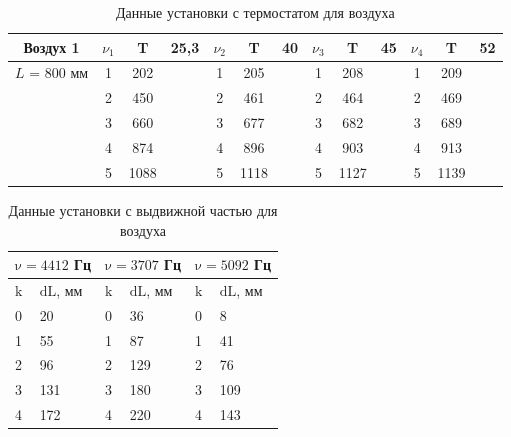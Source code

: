 \documentclass[a4paper, 12pt]{article}
\begin{document}
\begin{table}[!h]
\begin{center}
\caption{Данные установки с термостатом для воздуха}
\begin{tabular}{|c|c|c|c|c|c|c|c|c|c|c|c|c|}
\hline
Воздух 1     & $\nu_1$ & T    & 25,3 & $\nu_2$ & T    & 40 & $\nu_3$ & T    & 45 & $\nu_4$ & T    & 52 \\ \hline
$L$ = 800 мм & 1       & 202  &      & 1      & 205  &    & 1      & 208  &    & 1      & 209  &    \\ \hline
             & 2       & 450  &      & 2      & 461  &    & 2      & 464  &    & 2      & 469  &    \\ \hline
             & 3       & 660  &      & 3      & 677  &    & 3      & 682  &    & 3      & 689  &    \\ \hline
             & 4       & 874  &      & 4      & 896  &    & 4      & 903  &    & 4      & 913  &    \\ \hline
             & 5       & 1088 &      & 5      & 1118 &    & 5      & 1127 &    & 5      & 1139 &    \\ \hline
\end{tabular}
\end{center}
\end{table}

\begin{table}[!h]
\begin{center}
\begin{tabular}{|l|l|l|l|l|l|}
\hline \multicolumn{2}{|l|}{$\mathrm{\nu}=4412$ Гц} & \multicolumn{2}{|l|}{$\mathrm{\nu}=3707$ Гц} & \multicolumn{2}{|l|}{$\mathrm{\nu}=5092$ Гц}\\ \hline 
$\mathrm{k}$ & $\mathrm{dL}$, мм & $\mathrm{k}$ & $\mathrm{dL}$, мм & $\mathrm{k}$ & $\mathrm{dL}$, мм  \\ \hline 
0 & 20 & 0 & 36 & 0 & 8 \\ \hline 
1 & 55 & 1 & 87 &  1 & 41  \\ \hline 
2 & 96 & 2 & 129 &  2 & 76  \\ \hline 
3 & 131 & 3 & 180 & 3 & 109  \\ \hline 
4 & 172 & 4 & 220 & 4 & 143  \\ \hline
\end{tabular}
\caption{Данные установки с выдвижной частью для воздуха}
\end{center}
\end{table}
\end{document}
